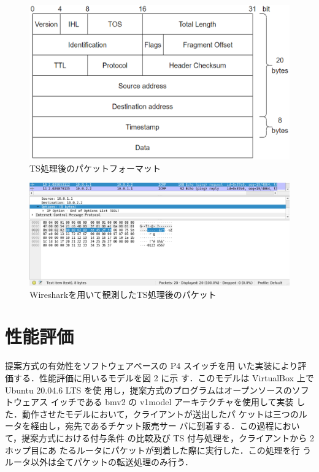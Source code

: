 \documentclass[a4j,11pt]{jreport}
\begin{document}
\begin{figure}[htbp]
  \centering
  \includegraphics[scale=0.65]{data/packet_format.eps}
  \vspace{0mm}
  \caption{TS処理後のパケットフォーマット}
  \label{fig:packet_format}
\end{figure}

\begin{figure}[htbp]
  \centering
  \includegraphics[scale=0.55]{data/wireshark3.eps}
  \vspace{0mm}
  \caption{Wiresharkを用いて観測したTS処理後のパケット}
  \label{fig:wireshark}
\end{figure}


\chapter{性能評価}

提案方式の有効性をソフトウェアベースの P4 スイッチを用
いた実装により評価する．性能評価に用いるモデルを図 2 に示
す．このモデルは VirtualBox 上で Ubuntu 20.04.6 LTS を使
用し，提案方式のプログラムはオープンソースのソフトウェアス
イッチである bmv2 の v1model アーキテクチャを使用して実装
した．動作させたモデルにおいて，クライアントが送出したパ
ケットは三つのルータを経由し，宛先であるチケット販売サー
バに到着する．この過程において，提案方式における付与条件
の比較及び TS 付与処理を，クライアントから 2 ホップ目にあ
たるルータにパケットが到着した際に実行した．この処理を行
うルータ以外は全てパケットの転送処理のみ行う．
\end{document}
